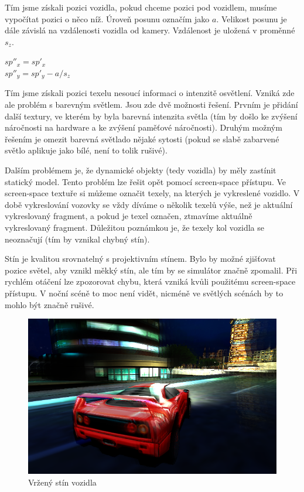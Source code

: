 \documentclass[11pt,twoside,a4paper]{book}
\begin{document}
Tím jsme získali pozici vozidla, pokud chceme pozici pod vozidlem, musíme vypočítat pozici o něco níž. Úroveň posunu označím jako $a$. Velikost posunu je dále závislá na vzdálenosti vozidla od kamery. Vzdálenost je uložená v proměnné $s_z$.
\begin{center}
$sp''_x = sp'_x$\\
$sp''_y = sp'_y - a / s_z$
\end{center}

Tím jsme získali pozici texelu nesoucí informaci o intenzitě osvětlení. Vzniká zde ale problém s barevným světlem. Jsou zde dvě možnosti řešení. Prvním je přidání další textury, ve kterém by byla barevná intenzita světla (tím by došlo ke zvýšení náročnosti na hardware a ke zvýšení paměťové náročnosti). Druhým možným řešením je omezit barevná světla\linebreak do nějaké sytosti (pokud se slabě zabarvené světlo aplikuje jako bílé, není to tolik rušivé).
\newpage

Dalším problémem je, že dynamické objekty (tedy vozidla) by měly zastínit statický model. Tento problém lze řešit opět pomocí screen-space přístupu. Ve screen-space textuře si můžeme označit texely, na kterých je vykreslené vozidlo. V době vykreslování vozovky se vždy díváme o několik texelů výše, než je aktuální vykreslovaný fragment, a pokud je texel označen, ztmavíme aktuálně vykreslovaný fragment. Důležitou poznámkou je, že texely kol vozidla se neoznačují (tím by vznikal chybný stín).

Stín je kvalitou srovnatelný s projektivním stínem. Bylo by možné zjišťovat pozice světel, aby vznikl měkký stín, ale tím by se simulátor značně zpomalil. Při rychlém otáčení lze zpozorovat chybu, která vzniká kvůli použitému screen-space přístupu. V noční scéně to moc není vidět, nicméně ve světlých scénách by to mohlo být značně rušivé.

\begin{center}
\begin{figure}[h]
\includegraphics[width=120mm]{figures/nearshadow.png}
\caption{Vržený stín vozidla}
\end{figure}
\end{center}
\end{document}
